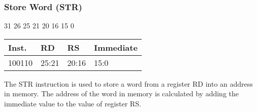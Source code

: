 \documentclass[12pt]{article}
\begin{document}

    \newpage
    \subsubsection{Store Word (STR)}
    
    \hspace{1.6cm}31 \hspace{1.15cm}26 \hspace{.05cm}25 \hspace{.8cm}21 \hspace{.05cm}20 \hspace{.8cm}16 \hspace{.05cm}15 \hspace{6.4cm}0
    \vspace{-.25cm}
    \begin{center}
        \begin{tabular}{ |p{1.8cm}|p{1.5cm}|p{1.5cm}|p{6.8cm}| }
            \hline
            \textbf{Inst.} & \textbf{RD} &  \textbf{RS} & \textbf{Immediate}\\
            \hline
            100110& 25:21 & 20:16 &15:0\\
            \hline
        \end{tabular}
    \end{center}
    
    \noindent
    The STR instruction is used to store a word from a register RD into an address in memory. The address of the word in memory is calculated by adding the immediate value to the value of register RS. 
    
\end{document}
